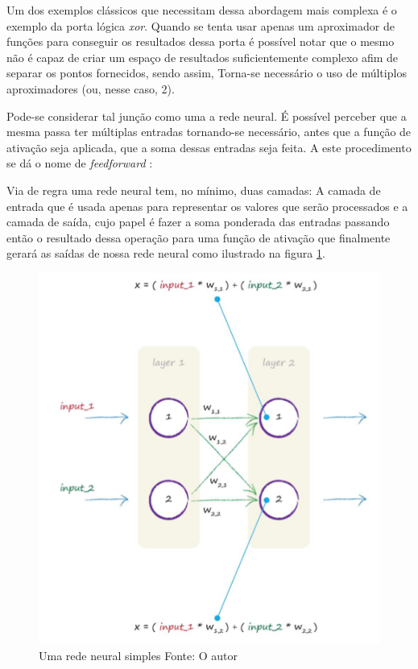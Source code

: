 \begin{apendicesenv}
		\par Um dos exemplos clássicos que necessitam dessa abordagem mais complexa é o exemplo da porta lógica \textit{xor}. Quando se tenta usar apenas um aproximador de funções para conseguir os resultados dessa porta é possível notar que o mesmo não é capaz de criar um espaço de resultados suficientemente complexo afim de separar os pontos fornecidos, sendo assim, Torna-se necessário o uso de múltiplos aproximadores (ou, nesse caso, 2).
		
		\par Pode-se considerar tal junção como uma a rede neural. É possível perceber que a mesma passa ter múltiplas entradas tornando-se necessário, antes que a função de ativação seja aplicada, que a soma dessas entradas seja feita. A este procedimento se dá o nome de \textit{feedforward} \cite{haykinredes}:
		
		\par Via de regra uma rede neural tem, no mínimo, duas camadas: A camada de entrada que é usada apenas para representar os valores que serão processados e a camada de saída, cujo papel é fazer a soma ponderada das entradas passando então o resultado dessa operação para uma função de ativação que finalmente gerará as saídas de nossa rede neural como ilustrado na figura \ref{fig:simpleNeuralNetwork}.
		
		\begin{figure}[H]
			\centering
			\caption[Uma rede neural simples Fonte: O autor]{Uma rede neural simples Fonte: O autor}
			\label{fig:simpleNeuralNetwork}
			\includegraphics[width=0.7\linewidth]{images/TEMPSimpleNN}
		\end{figure}		


\end{apendicesenv}
